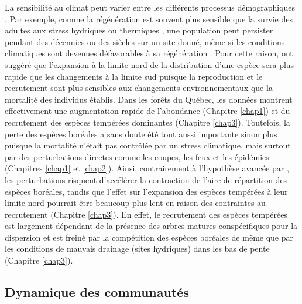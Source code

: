 La sensibilité au climat peut varier entre les différents processus
démographiques \citep{niinemets_responses_2010}. Par exemple, comme la
régénération est souvent plus sensible que la survie des adultes aux
stress hydriques ou thermiques \citep{niinemets_responses_2010}, une
population peut persister pendant des décennies ou des siècles sur un
site donné, même si les conditions climatiques sont devenues
défavorables à sa régénération \citep{talluto_extinction_2017}. Pour
cette raison, \citet{jump_altitude-for-latitude_2009} ont suggéré que
l'expansion à la limite nord de la distribution d'une espèce sera plus
rapide que les changements à la limite sud puisque la reproduction et le
recrutement sont plus sensibles aux changements environnementaux que la
mortalité des individus établis. Dans les forêts du Québec, les données
montrent effectivement une augmentation rapide de l'abondance (Chapitre
\ref{chap1}) et du recrutement des espèces tempérées dominantes
(Chapitre \ref{chap3}). Toutefois, la perte des espèces boréales a sans
doute été tout aussi importante sinon plus puisque la mortalité n'était
pas contrôlée par un stress climatique, mais surtout par des
perturbations directes comme les coupes, les feux et les épidémies
(Chapitres \ref{chap1} et \ref{chap2}). Ainsi, contrairement à
l'hypothèse avancée par \citet{jump_altitude-for-latitude_2009}, les
perturbations risquent d'accélérer la contraction de l'aire de
répartition des espèces boréales, tandis que l'effet sur l'expansion des
espèces tempérées à leur limite nord pourrait être beaucoup plus lent en
raison des contraintes au recrutement (Chapitre \ref{chap3}). En effet,
le recrutement des espèces tempérées est largement dépendant de la
présence des arbres matures conspécifiques pour la dispersion et est
freiné par la compétition des espèces boréales de même que par les
conditions de mauvais drainage (sites hydriques) dans les bas de pente
(Chapitre \ref{chap3}).

\hypertarget{dynamique-des-communautuxe9s}{%
\subsection{Dynamique des
communautés}\label{dynamique-des-communautuxe9s}}

